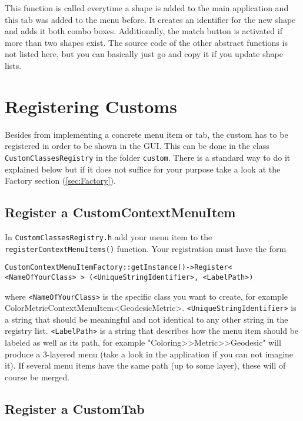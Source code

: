 This function is called everytime a shape is added to the main application and this tab was added to the menu before. It creates an identifier for the new shape and adds it both combo boxes. Additionally, the match button is activated if more than two shapes exist. The source code of the other abstract functions is not listed here, but you can basically just go and copy it if you update shape lists. 

\section{Registering Customs}
\label{sec:RegisterCustoms}

Besides from implementing a concrete menu item or tab, the custom has to be registered in order to be shown in the GUI. This can be done in the class \texttt{CustomClassesRegistry} in the folder \texttt{custom}. There is a standard way to do it explained below but if it does not suffice for your purpose take a look at the Factory section (\ref{sec:Factory}).

\subsection{Register a CustomContextMenuItem}
\label{subsec:RegisterMenuItem}

In \texttt{CustomClassesRegistry.h} add your menu item to the \texttt{registerContextMenuItems()} function. Your registration must have the form 

\texttt{CustomContextMenuItemFactory::getInstance()->Register< <NameOfYourClass> > \linebreak
	\hspace*{2ex}(<UniqueStringIdentifier>, <LabelPath>)}
	
where \texttt{<NameOfYourClass>} is the specific class you want to create, for example ColorMetricContextMenuItem<GeodesicMetric>. \texttt{<UniqueStringIdentifier>} is a string that should be meaningful and not identical to any other string in the registry list. \texttt{<LabelPath>} is a string that describes how the menu item should be labeled as well as its path, for example "Coloring>>Metric>>Geodesic" will produce a 3-layered menu (take a look in the application if you can not imagine it). If several menu items have the same path (up to some layer), these will of course be merged.

\subsection{Register a CustomTab}
\label{subsec:RegisterTab}

